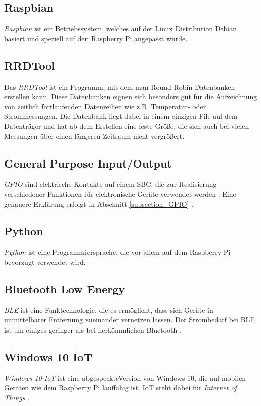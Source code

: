 \subsection*{Raspbian}
\textit{Raspbian} ist ein Betriebssystem, welches auf der Linux Distribution Debian basiert und speziell auf den Raspberry Pi angepasst wurde.

\subsection*{RRDTool}
Das \textit{RRDTool} ist ein Programm, mit dem man Round-Robin Datenbanken erstellen kann. Diese Datenbanken eignen sich besonders gut für die Aufzeichnung von zeitlich fortlaufenden Datenreihen wie z.B. Temperatur- oder Strommessungen. Die Datenbank liegt dabei in einem einzigen File auf dem Datenträger und hat ab dem Erstellen eine feste Größe, die sich auch bei vielen Messungen über einen längeren Zeitraum nicht vergrößert. 

\subsection*{General Purpose Input/Output}
\textit{\ac{GPIO}} sind elektrische Kontakte auf einem SBC, die zur Realisierung verschiedener Funktionen für elektronische Geräte verwendet werden \citep{Raspberri_Pi_Handbuch}. Eine genauere Erklärung erfolgt in Abschnitt \ref{subsection_GPIO} .

\subsection*{Python}
\textit{Python} ist eine Programmiersprache, die vor allem auf dem Raspberry Pi bevorzugt verwendet wird.

\subsection*{Bluetooth Low Energy}
\textit{\ac{BLE}} ist eine Funktechnologie, die es ermöglicht, dass sich Geräte in unmittelbarer Entfernung zueinander vernetzen lassen. Der Strombedarf bei \ac{BLE} ist um einiges geringer als bei herkömmlichen Bluetooth \citep{Bluetooth_Low_Energy}.
\subsection*{Windows 10 IoT}
\textit{Windows 10 IoT} ist eine \glqq abgespeckte\grqq \;Version von Windows 10, die auf mobilen Geräten wie dem Raspberry Pi lauffähig ist. IoT steht dabei für \textit{Internet of Things} \citep{Raspberri_Pi_Handbuch}.

